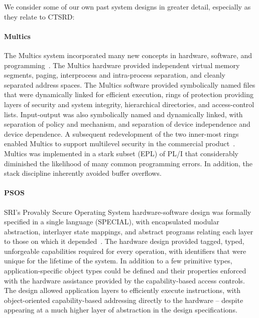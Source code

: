 We consider some of our own past system designs in greater detail,
especially as they relate to CTSRD:

\paragraph{Multics} %
The Multics system incorporated many new concepts in hardware, software,
and programming~\cite{Organick,DaleyNeumann}.
The Multics hardware provided independent virtual
memory segments, paging, interprocess and intra-process separation,
and cleanly separated address spaces.
The Multics software provided
symbolically named files that were dynamically linked for efficient
execution, rings of protection providing layers of security and system
integrity, hierarchical directories, and access-control lists.
Input-output was also symbolically named and dynamically linked, with
separation of policy and mechanism, and separation of device
independence and device dependence.
A subsequent redevelopment of the two
inner-most rings enabled Multics to support multilevel security in the
commercial product~\cite{schroeder:multicssecuritykernel}.
Multics was implemented in a stark subset (EPL) of
PL/I that considerably diminished the likelihood of many common
programming errors.
In addition, the stack discipline inherently
avoided buffer overflows.

\paragraph{PSOS} %
SRI's Provably Secure Operating System hardware-software design was formally
specified in a single language (SPECIAL), 
with encapsulated modular abstraction, interlayer state mappings,
and abstract programs relating each layer to those on which it
depended~\cite{PSOS,NeumannFeiertag03}.
The hardware design provided tagged, typed, unforgeable
capabilities required for every operation, with identifiers that were unique
for the lifetime of the system.  In addition to a
few primitive types, application-specific object types could be defined and
their properties enforced with the hardware assistance provided by the
capability-based access controls.  The design allowed application layers to
efficiently execute instructions, with object-oriented 
capability-based addressing directly to the hardware -- despite appearing at
a much higher layer of abstraction in the design specifications.

%

